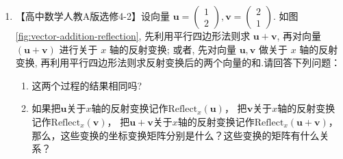 \begin{exercise}

  \begin{enumerate}
    \item   【高中数学人教A版选修4-2】设向量 $\boldsymbol{u}=\left(\begin{array}{l}1 \\ 2\end{array}\right), \boldsymbol{v}=\left(\begin{array}{l}2 \\ 1\end{array}\right)$. 
            如图 \ref{fig:vector-addition-reflection}, 先利用平行四边形法则求 $\boldsymbol{u}+\boldsymbol{v}$, 再对向量 $(\boldsymbol{u}+\boldsymbol{v})$ 进行关于 $x$ 轴的反射变换; 
            或者, 先对向量 $\boldsymbol{u}, \boldsymbol{v}$ 做关于 $x$ 轴的反射变换, 
            再利用平行四边形法则求反射变换后的两个向量的和.请回答下列问题：

            \begin{enumerate}
              \item 这两个过程的结果相同吗?
              \item 如果把$\boldsymbol{u}$关于$x$轴的反射变换记作$\text{Reflect}_{x}(\boldsymbol{u})$，
              把$\boldsymbol{v}$关于$x$轴的反射变换记作$\text{Reflect}_{x}(\boldsymbol{v})$，
              把$\boldsymbol{u}+\boldsymbol{v}$关于$x$轴的反射变换记作$\text{Reflect}_{x}(\boldsymbol{u}+\boldsymbol{v})$，
              那么，这些变换的坐标变换矩阵分别是什么？这些变换的矩阵有什么关系？
            \end{enumerate}

            \begin{figure}[!h]
            \centering
\end{figure}
\end{enumerate}
\end{exercise}
